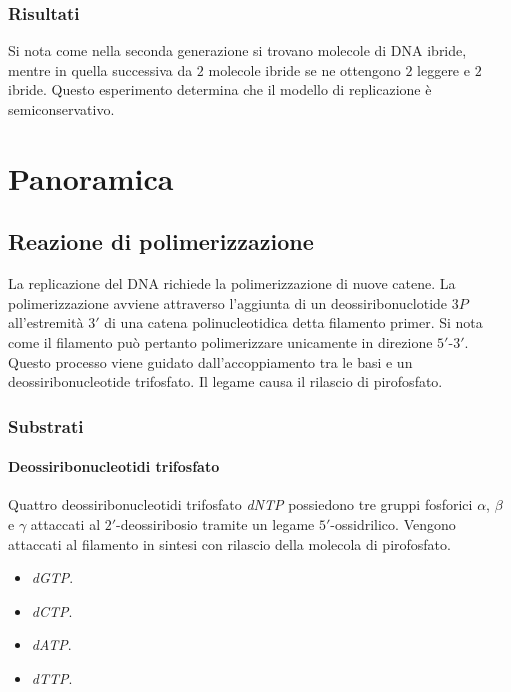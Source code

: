 		\subsubsection{Risultati}
		Si nota come nella seconda generazione si trovano molecole di DNA ibride, mentre in quella successiva da $2$ molecole ibride se ne ottengono $2$ leggere e $2$ ibride.
		Questo esperimento determina che il modello di replicazione \`e semiconservativo.


\section{Panoramica}

	\subsection{Reazione di polimerizzazione}
	La replicazione del DNA richiede la polimerizzazione di nuove catene.
	La polimerizzazione avviene attraverso l'aggiunta di un deossiribonuclotide $3P$ all'estremit\`a $3'$ di una catena polinucleotidica detta filamento primer.
	Si nota come il filamento pu\`o pertanto polimerizzare unicamente in direzione $5'$-$3'$.
	Questo processo viene guidato dall'accoppiamento tra le basi e un deossiribonucleotide trifosfato.
	Il legame causa il rilascio di pirofosfato.

		\subsubsection{Substrati}

			\paragraph{Deossiribonucleotidi trifosfato}
			Quattro deossiribonucleotidi trifosfato \emph{dNTP} possiedono tre gruppi fosforici $\alpha$, $\beta$ e $\gamma$ attaccati al $2'$-deossiribosio tramite un legame $5'$-ossidrilico.
			Vengono attaccati al filamento in sintesi con rilascio della molecola di pirofosfato.
			\begin{multicols}{4}
				\begin{itemize}
					\item \emph{dGTP}.
					\item \emph{dCTP}.
					\item \emph{dATP}.
					\item \emph{dTTP}.
				\end{itemize}
			\end{multicols}

